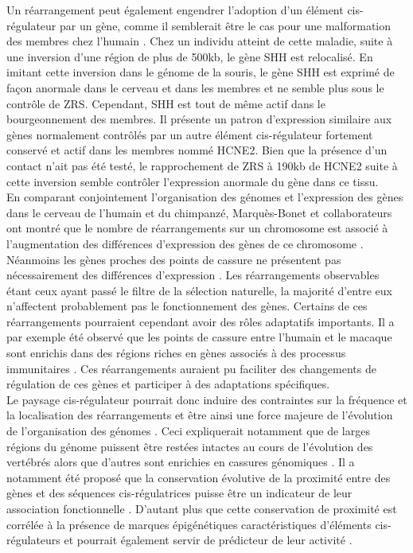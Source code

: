 Un réarrangement peut également engendrer l’adoption d’un élément \gls{cis}-régulateur par un gène, comme il semblerait être le cas pour une malformation des membres chez l’humain \citep{lettice_enhancer-adoption_2011}. Chez un individu atteint de cette maladie, suite à une inversion d’une région de plus de 500kb, le gène \acrshort{SHH} est relocalisé. En imitant cette inversion dans le génome de la souris, le gène \acrshort{SHH} est exprimé de façon anormale dans le cerveau et dans les membres et ne semble plus sous le contrôle de \acrshort{ZRS}. Cependant, \acrshort{SHH} est tout de même actif dans le bourgeonnement des membres. Il présente un patron d’expression similaire aux gènes normalement contrôlés par un autre élément \gls{cis}-régulateur fortement conservé et actif dans les membres nommé HCNE2. Bien que la présence d’un contact n'ait pas été testé, le rapprochement de \acrshort{ZRS} à 190kb de HCNE2 suite à cette inversion semble contrôler l’expression anormale du gène dans ce tissu. \\

En comparant conjointement l’organisation des génomes et l’expression des gènes dans le cerveau de l’humain et du chimpanzé, Marquès-Bonet et collaborateurs ont montré que le nombre de réarrangements sur un chromosome est associé à l’augmentation des différences d’expression des gènes de ce chromosome \citep{marques-bonet_chromosomal_2004}. Néanmoins les gènes proches des points de cassure ne présentent pas nécessairement des différences d’expression \citep{munoz_detection_2012}. Les réarrangements observables étant ceux ayant passé le filtre de la sélection naturelle, la majorité d’entre eux n’affectent probablement pas le fonctionnement des gènes. Certains de ces réarrangements pourraient cependant avoir des rôles adaptatifs importants. Il a par exemple été observé que les points de cassure entre l’humain et le macaque sont enrichis dans des régions riches en gènes associés à des processus immunitaires \citep{ullastres_unraveling_2014}. Ces réarrangements auraient pu faciliter des changements de régulation de ces gènes et participer à des adaptations spécifiques. \\

Le paysage \gls{cis}-régulateur pourrait donc induire des contraintes sur la fréquence et la localisation des réarrangements et être ainsi une force majeure de l’évolution de l’organisation des génomes \citep{mongin_long-range_2009}. Ceci expliquerait notamment que de larges régions du génome puissent être restées intactes au cours de l’évolution des vertébrés alors que d’autres sont enrichies en cassures génomiques \citep{naville_long-range_2015, berthelot_3d_2015}. Il a notamment été proposé que la conservation évolutive de la proximité entre des gènes et des séquences \gls{cis}-régulatrices puisse être un indicateur de leur association fonctionnelle \citep{ahituv_mapping_2005,mongin_long-range_2009, clement_enhancergene_2020}. D’autant plus que cette conservation de proximité est corrélée à la présence de marques épigénétiques caractéristiques d’éléments \gls{cis}-régulateurs et pourrait également servir de prédicteur de leur activité \citep{naville_long-range_2015}. 

